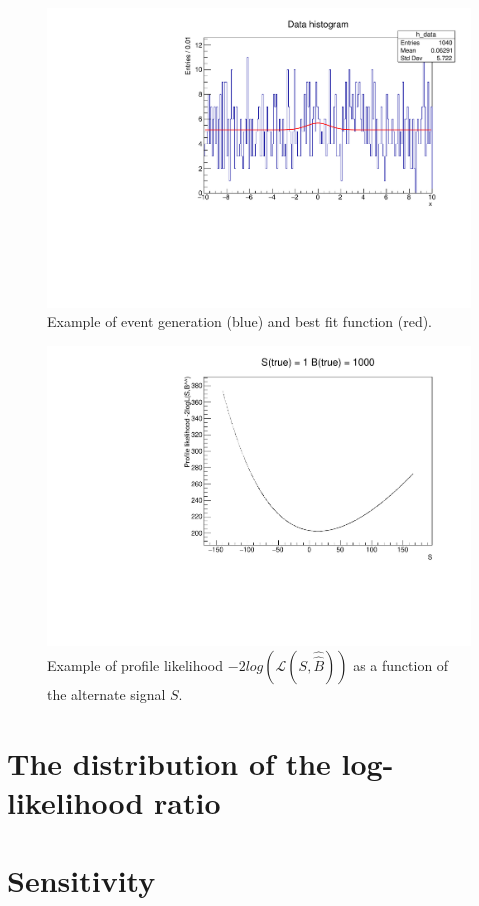 \documentclass[10pt, oneside]{article}   	%
\begin{document}
\begin{figure}[h]
    \centering
    \includegraphics[width=\textwidth]{Events_S1B1000.pdf}
    \caption{Example of event generation (blue) and best fit function (red).}
    \label{fig:events_b1000}
\end{figure}

\begin{figure}[h]
    \centering
    \includegraphics[width=\textwidth]{ProfileLikelihood_S1B1000.pdf}
    \caption{Example of profile likelihood $-2log(\mathcal{L}(S,\hat{\hat{B}}))$ as a function of the alternate signal $S$.}
    \label{fig:profileL_b1000}
\end{figure}

\section{The distribution of the log-likelihood ratio}

\section{Sensitivity}
\end{document}
